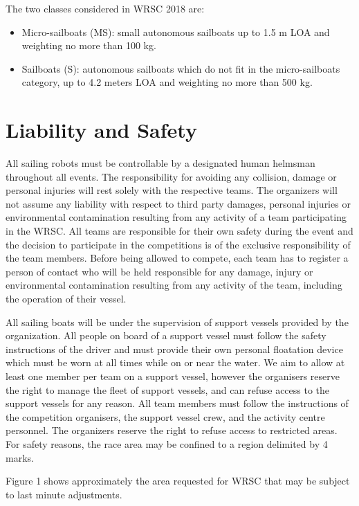\documentclass[12pt]{article}
\begin{document}
The two classes considered in WRSC 2018 are:
\begin{itemize}
  \item Micro-sailboats (MS): small autonomous sailboats up to 1.5 m LOA and weighting no more than 100 kg.
  \item Sailboats (S): autonomous sailboats which do not fit in the micro-sailboats category, up to
4.2 meters LOA and weighting no more than 500 kg.
\end{itemize}

\section{Liability and Safety}
All sailing robots must be controllable by a designated human helmsman
throughout all events. The responsibility for avoiding any collision, 
damage or personal injuries will rest solely with the respective teams. 
The organizers will not assume any liability with respect to third party
damages, personal injuries or environmental contamination resulting from any
activity of a team participating in the WRSC. All teams are responsible for 
their own safety during the event and the decision to participate in the 
competitions is of the exclusive responsibility of the team members.
Before being allowed to compete, each team has to register a person of contact
who will be held responsible for any damage, injury or environmental
contamination resulting from any activity of the team, including the 
operation of their vessel.

All sailing boats will be under the supervision of support vessels provided by the
organization.
All people on board of a support vessel must follow the safety instructions of the driver 
and must provide their own personal floatation device which must be worn at all times 
while on or near the water. We aim to allow at least one member per team on a support vessel, 
however the organisers reserve the
right to manage the fleet of support vessels, and can refuse access to the support
vessels for any reason.
All team members must follow the instructions of the competition
organisers, the support vessel crew, and the activity centre personnel. The organizers
reserve the right to refuse access to restricted areas.
For safety reasons, the race area may be confined to a region delimited by 4
marks. 



Figure 1
shows approximately the area requested for WRSC that may be subject to last
minute adjustments.
\end{document}
